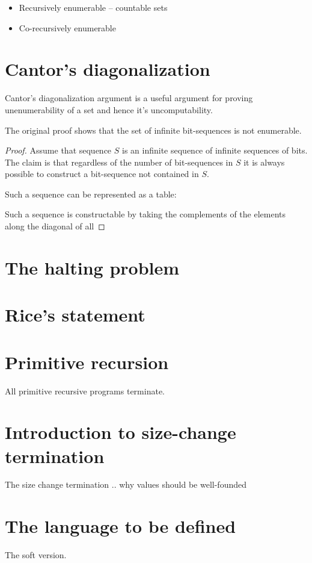 \begin{itemize}

\item Recursively enumerable -- countable sets

\item Co-recursively enumerable

\end{itemize}


\section{Cantor's diagonalization}

Cantor's diagonalization argument is a useful argument for proving
unenumerability of a set and hence it's uncomputability.

The original proof shows that the set of infinite bit-sequences is not
enumerable.

\begin{proof} Assume that sequence $S$ is an infinite sequence of infinite
sequences of bits. The claim is that regardless of the number of bit-sequences
in $S$ it is always possible to construct a bit-sequence not contained in $S$.

Such a sequence can be represented as a table:


Such a sequence is constructable by taking the complements of the elements along the diagonal of all 



\end{proof}


\section{The halting problem}

\section{Rice's statement}


\section{Primitive recursion}

All primitive recursive programs terminate.

\section{Introduction to size-change termination}

The size change termination .. why values should be well-founded

\section{The language to be defined}

The soft version.
